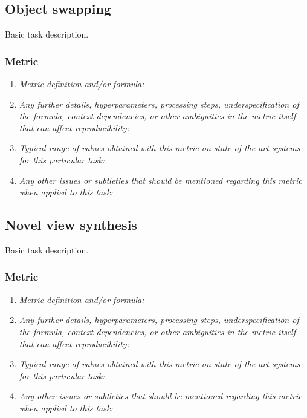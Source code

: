 \documentclass[a4paper,11pt]{article}
\begin{document}
\subsection{Object swapping}
    Basic task description.
    \subsubsection{Metric}
        \begin{enumerate}[label=\alph*.]
            \item \textit{Metric definition and/or formula:}
            \bigskip
            \item \textit{Any further details, hyperparameters, processing steps, underspecification of the formula, context dependencies, or other ambiguities in the metric itself that can affect reproducibility:}
            \bigskip
            \item \textit{Typical range of values obtained with this metric on state-of-the-art systems for this particular task:}
            \bigskip
            \item \textit{Any other issues or subtleties that should be mentioned regarding this metric when applied to this task:}
            \bigskip
        \end{enumerate}

\subsection{Novel view synthesis} \label{novel_view_synthesis}
    Basic task description.
    \subsubsection{Metric}
        \begin{enumerate}[label=\alph*.]
            \item \textit{Metric definition and/or formula:}
            \bigskip
            \item \textit{Any further details, hyperparameters, processing steps, underspecification of the formula, context dependencies, or other ambiguities in the metric itself that can affect reproducibility:}
            \bigskip
            \item \textit{Typical range of values obtained with this metric on state-of-the-art systems for this particular task:}
            \bigskip
            \item \textit{Any other issues or subtleties that should be mentioned regarding this metric when applied to this task:}
            \bigskip
        \end{enumerate}
\end{document}
